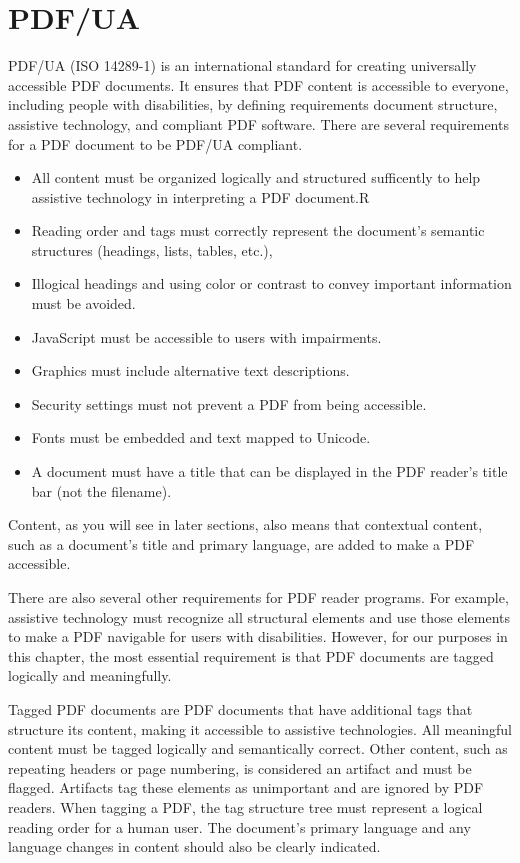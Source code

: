 \documentclass[american,letterpaper]{tufte-book}
\numberwithin{equation}{section}
\numberwithin{figure}{section}
\begin{document}
{{\section{PDF/UA}

PDF/UA (ISO 14289-1) is an international standard for creating universally
accessible PDF documents.\cite{iso_central_secretary_systems_2016}
It ensures that PDF content is accessible to everyone, including people
with disabilities, by defining requirements document structure, assistive
technology, and compliant PDF software. There are several requirements
for a PDF document to be PDF/UA compliant. 
\begin{itemize}
\item All content must be organized logically and structured sufficently to help assistive technology in interpreting a PDF document.R
\item Reading order and tags must correctly
represent the document's semantic structures (headings, lists, tables,
etc.),
\item Illogical headings and using color or contrast to convey important
information must be avoided.
\item JavaScript must be accessible to users with impairments.
\item Graphics must include alternative text descriptions.
\item Security settings must not prevent a PDF from being accessible.
\item Fonts must be embedded and text mapped to Unicode.
\item A document must have a title
that can be displayed in the PDF reader's title bar (not the filename).
\end{itemize}
Content, as you will see in later sections, also means that contextual
content, such as a document's title and primary language, are added
to make a PDF accessible. 

There are also several other requirements for
PDF reader programs. For example, assistive technology must recognize
all structural elements and use those elements to make a PDF navigable
for users with disabilities. However, for our purposes in this chapter,
the most essential requirement is that PDF documents are tagged logically
and meaningfully.

Tagged PDF documents are PDF documents that have additional tags that
structure its content, making it accessible to assistive technologies.
All meaningful content must be tagged logically and semantically correct.
Other content, such as repeating headers or page numbering, is considered
an artifact and must be flagged. Artifacts tag these elements as unimportant
and are ignored by PDF readers. When tagging a PDF,
the tag structure tree must represent a logical reading order for
a human user. The document's primary language and any language changes
in content should also be clearly indicated. 

}}
\end{document}
